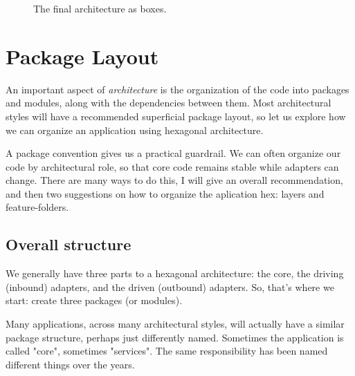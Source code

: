 \begin{figure}[htbp]
    \centering
    \resizebox{0.6\textwidth}{!}{%
        
    }
    \caption{The final architecture as boxes.}
    \label{fig:hexagonal_as_boxes}
\end{figure}


\section{Package Layout}
\label{sec:hexagonal_package_layout}

An important aspect of \textit{architecture} is the organization of the code into packages and modules, along with the dependencies between them. Most architectural styles will have a recommended superficial package layout, so let us explore how we can organize an application using hexagonal architecture.

A package convention gives us a practical guardrail. We can often organize our code by architectural role, so that core code remains stable while adapters can change. There are many ways to do this, I will give an overall recommendation, and then two suggestions on how to organize the aplication hex: layers and feature-folders. 

\subsection{Overall structure}

We generally have three parts to a hexagonal architecture: the core, the driving (inbound) adapters, and the driven (outbound) adapters. So, that's where we start: create three packages (or modules).

\begin{figure}[h]
\centering
\begin{minipage}{0.8\textwidth}
\end{minipage}
\end{figure}

Many applications, across many architectural styles, will actually have a similar package structure, perhaps just differently named. Sometimes the application is called "core", sometimes "services". The same responsibility has been named different things over the years.

